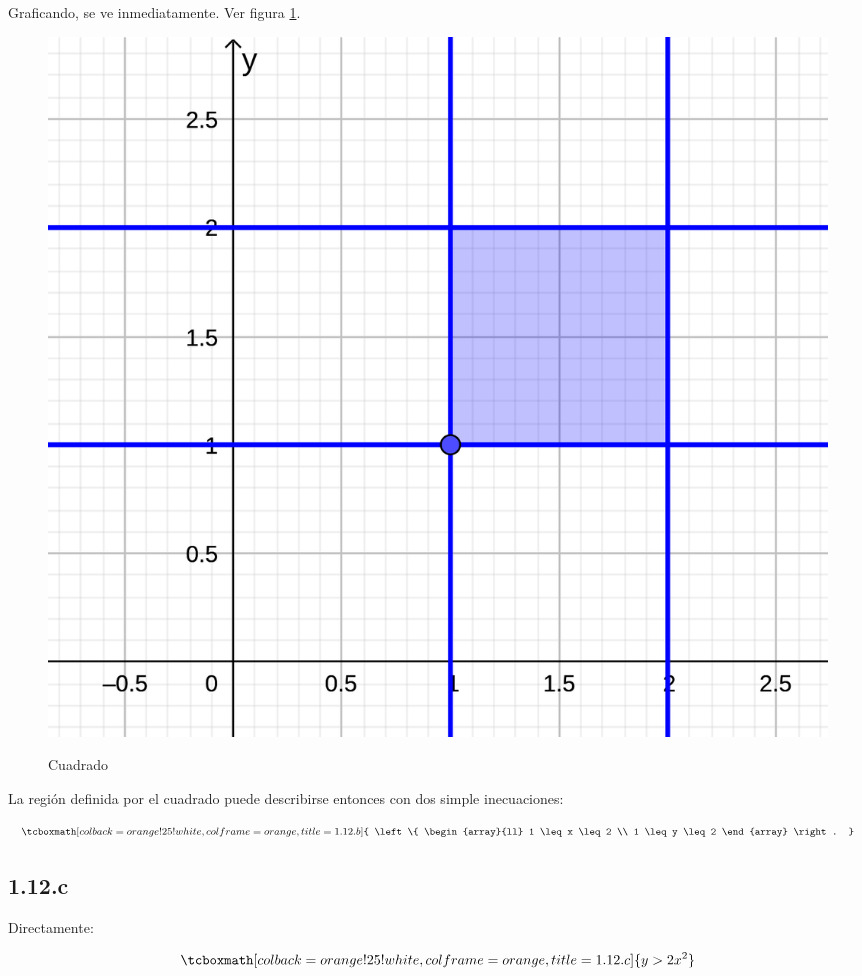 \documentclass{article}
\begin{document}
Graficando, se ve inmediatamente. Ver figura \ref{fig:1-12-b}.

\begin{figure}[ht]
\caption{Cuadrado}
\includegraphics[scale=1.4]{../img/exercises/guide_01/12_b.png} 
\centering
\label{fig:1-12-b}
\end{figure}

La región definida por el cuadrado puede describirse entonces con dos simple inecuaciones:

\begin{equation}
\tcboxmath[colback=orange!25!white,colframe=orange,title=1.12.b]
{ \left\{ \begin{array}{ll}
1 \leq x \leq 2 \\
1 \leq y \leq 2
\end{array} \right. }
\end{equation}

\subsection*{1.12.c}
\label{subsec:1.12.c}

Directamente:

\begin{equation}
\tcboxmath[colback=orange!25!white,colframe=orange,title=1.12.c]
{ y > 2 x^2 }
\end{equation}
\end{document}
